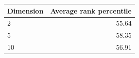 \begin{tabular}{lr}
\toprule
Dimension & Average rank percentile \\
\midrule
2 & 55.64 \\
5 & 58.35 \\
10 & 56.91 \\
\bottomrule
\end{tabular}
